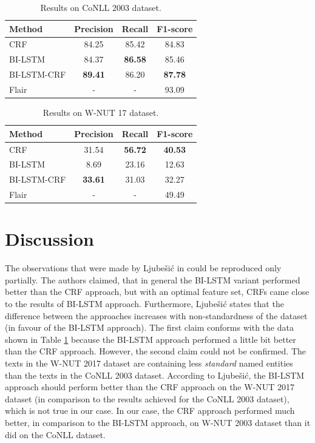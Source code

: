 \documentclass[12pt]{book}
\begin{document}
	
	\begin{table}
		\begin{center}
			\begin{tabular}{| l | c | c | c |}
				\hline
				Method & Precision & Recall & F1-score \\ \hline
				CRF & 84.25 & 85.42 & 84.83 \\ \hline
				BI-LSTM & 84.37 & \textbf{86.58} & 85.46 \\ \hline
				BI-LSTM-CRF & \textbf{89.41} & 86.20 & \textbf{87.78} \\ \hline
				Flair & - & - & 93.09 \\ \hline
			\end{tabular}
		\end{center}
		\caption{Results on CoNLL 2003 dataset.}
		\label{tab:res_conll}
	\end{table}

	\begin{table}
		\begin{center}
			\begin{tabular}{| l | c | c | c |}
				\hline
				Method & Precision & Recall & F1-score \\ \hline
				CRF & 31.54 & \textbf{56.72} & \textbf{40.53} \\ \hline
				BI-LSTM & 8.69 & 23.16 & 12.63 \\ \hline
				BI-LSTM-CRF & \textbf{33.61} & 31.03 & 32.27 \\ \hline
				Flair & - & - & 49.49 \\ \hline
			\end{tabular}
		\end{center}
		\caption{Results on W-NUT 17 dataset.}
		\label{tab:res_wnut}
	\end{table}

	\section{Discussion}
	\label{sec:discussion}

	The observations that were made by Ljube{\v{s}}i{\'c} in \cite{ljubevsic2018comparing} could be reproduced only partially. The authors claimed, that in general the BI-LSTM variant performed better than the CRF approach, but with an optimal feature set, CRFs came close to the results of BI-LSTM approach. Furthermore, Ljube{\v{s}}i{\'c} states that the difference between the approaches increases with non-standardness of the dataset (in favour of the BI-LSTM approach). The first claim conforms with the data shown in Table \ref{tab:res_conll} because the BI-LSTM approach performed a little bit better than the CRF approach. However, the second claim could not be confirmed. The texts in the W-NUT 2017 dataset are containing less \textit{standard} named entities than the texts in the CoNLL 2003 dataset. According to Ljube{\v{s}}i{\'c}, the BI-LSTM approach should perform better than the CRF approach on the W-NUT 2017 dataset (in comparison to the results achieved for the CoNLL 2003 dataset), which is not true in our case. In our case, the CRF approach performed much better, in comparison to the BI-LSTM approach, on W-NUT 2003 dataset than it did on the CoNLL dataset.
	
\end{document}
